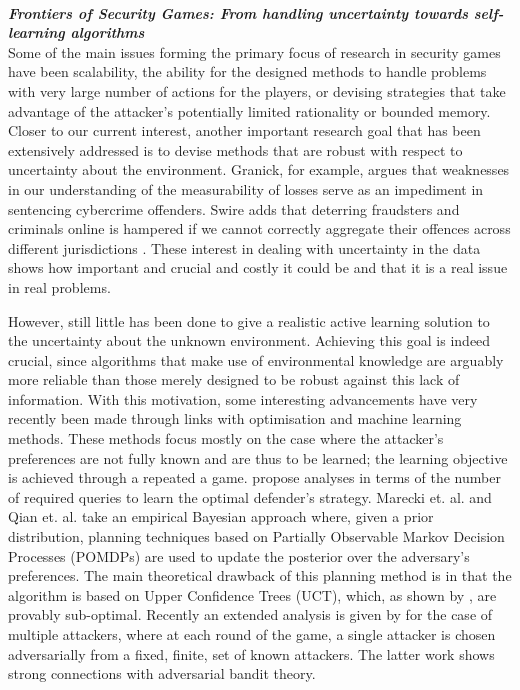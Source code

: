 \noindent \textbf{\textit{\\Frontiers of Security Games: From handling uncertainty towards self-learning algorithms}}\\
Some of the main issues forming the primary focus of research in security games have been scalability, the ability for the designed methods to handle problems with very large number of actions for the players, or devising strategies that take advantage of the attacker's potentially limited rationality or bounded memory\cite{tambe2012game}. Closer to our current interest, another important research goal that has been extensively addressed is to devise methods that are robust with respect to uncertainty about the environment\cite{aghassi2006robust,Nguyen14RO, Kiekintveld:2013}.
Granick, for example,
argues that weaknesses in our understanding of the measurability of losses serve as
an impediment in sentencing cybercrime offenders\cite{granick2005faking}. Swire adds that deterring
fraudsters and criminals online is hampered if we cannot correctly aggregate their
offences across different jurisdictions \cite{swire2009no}. These  interest in dealing with uncertainty in the data shows how important and crucial and costly it could be and that it is a real issue in real problems.


However, still little has been done to give a realistic active learning solution to the uncertainty about  the unknown environment. Achieving this goal is indeed crucial, since algorithms that make use of environmental knowledge are arguably more reliable than those merely designed to be robust against this lack of information. With this motivation, some interesting advancements have very recently been made through links with optimisation and machine learning methods. 
These methods focus mostly on the case where the attacker's preferences are not fully known and are thus to be learned; the learning objective is achieved through a repeated a game.  \cite{blum2014learning, letchford2009learning} propose analyses in terms of the number of required queries to learn the optimal defender's strategy. 
Marecki et. al. and Qian et. al.\cite{Marecki12PR, qian2014online} take an empirical Bayesian approach where, given a prior distribution, planning techniques based on Partially Observable Markov Decision Processes (POMDPs) are used to update the posterior over the adversary's preferences.
The main theoretical drawback of this planning method is in that the algorithm is based on Upper Confidence Trees (UCT), which, as shown by  \cite{munos2014bandits}, are provably sub-optimal. 
Recently an extended analysis is given by \cite{Balcan15CR}  for the case of multiple attackers, where at each round of the game, a single attacker is chosen adversarially from a fixed, finite, set of known attackers. The latter work shows strong connections with adversarial bandit theory. 

